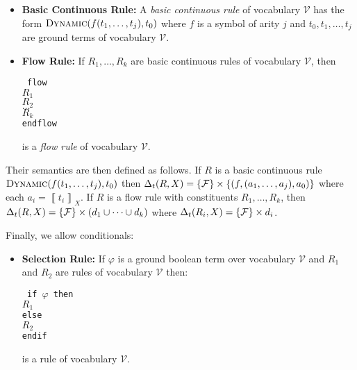 \documentclass[envcountsame]{llncs}
\newcommand{\U}{\ensuremath{\mathcal {V}}}
\newcommand{\evaluation}[2][]{\ensuremath{\left\llbracket #2\right\rrbracket_{#1}}}
\newcommand{\val}[2]{\evaluation[#2]{#1}}
\newcommand{\update}[3]{(#1,#2,#3)}\spnewtheorem{postulate}{Postulate}{\bfseries}{\itshape}
\newcommand{\gen}[1]{\Delta_t(#1)}
\newenvironment{ttcode}{\begin{ttfamily}\rm\tt}{\end{ttfamily}}
\newcommand\s{\phantom{x}}
\begin{document}
\begin{definition}\begin{itemize}
\item \textbf{Basic Continuous Rule:}
  A \emph{basic continuous rule} of vocabulary $\U$ has the
  form $\textsc{Dynamic}(f (t_1,\dots,t_j) , t_0) $ where $f$ is a symbol of arity  $j$ and $t_0,t_1,\dots,t_j$ are ground terms of vocabulary $\U$.





\item \textbf{Flow Rule:}
If $R_1,\dots,R_k$ are basic continuous rules of vocabulary $\U$, then
  \begin{center}
  \begin{minipage}{8cm}
\begin{ttcode}
flow \\ 
\s $R_1$ \\ 
\s  $R_2$ \\
\s  $\dots$ \\ 
\s $R_k$ \\ 
endflow \\ 
\end{ttcode}
  \end{minipage}
   \end{center}
is a \emph{flow rule} of vocabulary $\U$.
\end{itemize}
\end{definition}

Their semantics are then defined as follows.
If $R$ is a  basic continuous rule $\textsc{Dynamic}(f (t_1,\dots,t_j) ,t_0)$ then
$\gen{R,X} = \C{\{\update{f}{{(a_1,\dots,a_j)}}{a_0}\}}$
where each $a_i= \val{t_i}{X}$.
If $R$ is a  flow rule with constituents $R_1,\dots,R_k$, then
$\gen{R,X} = \C{(d_1 \cup \dots \cup d_k)}$
where $\gen{R_i,X} = \C{d_i }$.


Finally, we allow conditionals:

\begin{definition}
\begin{itemize}
\item \textbf{Selection Rule:}
If $\varphi$ is a ground boolean term over vocabulary $\U$ and
  $R_1$ and $R_2$ are  rules of vocabulary $\U$ then:
   \begin{center}
   \begin{minipage}{8cm}
    \begin{ttcode}
      if $\varphi$ then \\
     \s $R_1$ \\ 
      else\\
      \s $R_2$ \\ 
      endif \\
    \end{ttcode}
   \end{minipage}
   \end{center}
is a rule of vocabulary $\U$.
\end{itemize}
\end{definition}
\end{document}
